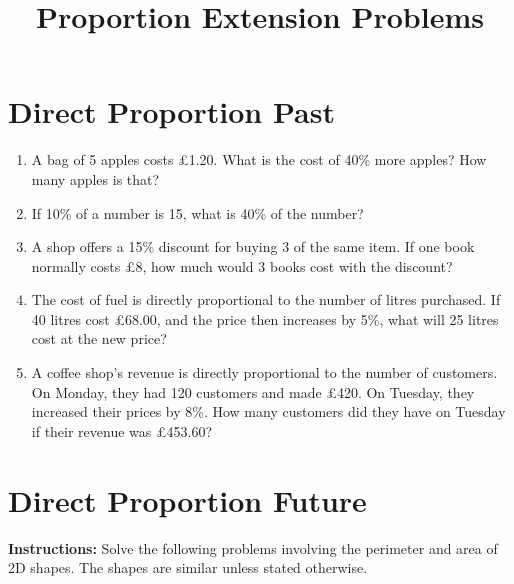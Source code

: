 \documentclass[12pt]{article}
\title{Proportion Extension Problems}
\date{}
\begin{document}
\maketitle

\section*{Direct Proportion Past}

\begin{enumerate}
    \item A bag of 5 apples costs £1.20. What is the cost of 40\% more apples? How many apples is that?
    \vspace{0.6cm}


    \item If 10\% of a number is 15, what is 40\% of the number?
    \vspace{0.6cm}

    \item A shop offers a 15\% discount for buying 3 of the same item. If one book normally costs £8, how much would 3 books cost with the discount?
    \vspace{0.6cm}

    \item The cost of fuel is directly proportional to the number of litres purchased. If 40 litres cost £68.00, and the price then increases by 5\%, what will 25 litres cost at the new price?
    \vspace{0.6cm}

    \item A coffee shop's revenue is directly proportional to the number of customers. On Monday, they had 120 customers and made £420. On Tuesday, they increased their prices by 8\%. How many customers did they have on Tuesday if their revenue was £453.60?
\end{enumerate}

\vspace{1.2cm}

\newpage{}

\section*{Direct Proportion Future}

\textbf{Instructions:} Solve the following problems involving the perimeter and area of 2D shapes. The shapes are similar unless stated otherwise.
\end{document}
